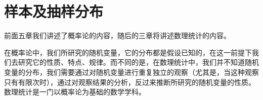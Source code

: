 \chapter{样本及抽样分布}
前面五章我们讲述了概率论的内容，随后的三章将讲述数理统计的内容。

在概率论中，我们所研究的随机变量，它的分布都是假设已知的，在这一前提下我们去研究它的性质、特点、规律。而不同的是，在数理统计中，我们并不知道随机变量的分布，我们需要通过对随机变量进行重复独立的观察（尤其是，当这种观察只有有限次时），通过对观察结果的分析，反过来推断所研究的随机变量的性质。数理统计是一门以概率论为基础的数学学科。


